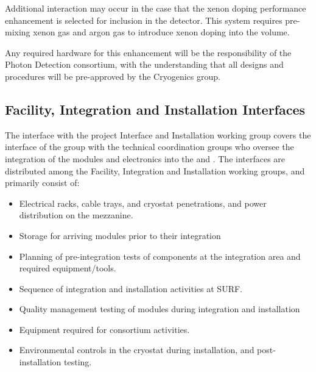 Additional interaction may occur in the case that the xenon doping performance enhancement is selected for inclusion in the detector.  This system requires pre-mixing xenon gas and argon gas to introduce xenon doping into the \lar volume. 


Any required hardware for this enhancement will be the responsibility of the Photon Detection consortium, with the understanding that all designs and procedures will be pre-approved by the Cryogenics group. 


\subsection{Facility, Integration and Installation Interfaces}

The interface with the project Interface and Installation working group covers the interface of the  group with the technical coordination groups who oversee the integration of the  modules and electronics into the  and . The interfaces are distributed among the Facility, Integration and Installation working groups, and primarily consist of:
\begin{itemize}
    \item Electrical racks, cable trays, and cryostat penetrations, and power distribution on the mezzanine.
    \item Storage for arriving  modules prior to their integration
    \item Planning of pre-integration tests of  components at the integration area and required equipment/tools.
    \item Sequence of integration and installation activities at SURF.
    \item Quality management testing of  modules during integration and installation
    \item Equipment required for  consortium activities.
    \item Environmental controls in the cryostat during installation, and post-installation testing.
\end{itemize}

